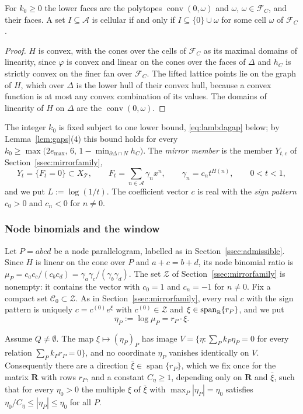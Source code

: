 \begin{lemma}\label{lem:hull}
For $k_0\ge0$ the lower faces are the polytopes $\operatorname{conv}(0,\omega)$ and $\omega$, $\omega\in\mathcal F_C$, and
their faces. A set $I\subseteq\mathcal A$ is cellular if and only if $I\subseteq\{0\}\cup\omega$ for some cell $\omega$ of
$\mathcal F_C$.
\end{lemma}

\begin{proof}
$H$ is convex, with the cones over the cells of $\mathcal F_C$ as its maximal domains of linearity, since $\varphi$ is
convex and linear on the cones over the faces of $\Delta$ and $h_C$ is strictly convex on the finer fan over
$\mathcal F_C$. The lifted lattice points lie on the graph of $H$, which over $\Delta$ is the lower hull of their convex
hull, because a convex function is at most any convex combination of its values. The domains of linearity of $H$ on
$\Delta$ are the $\operatorname{conv}(0,\omega)$.
\end{proof}

The integer $k_0$ is fixed subject to one lower bound, \eqref{eq:lambdagap} below; by Lemma~\ref{lem:gaps}(4) this
bound holds for every $k_0\ge\max\bigl(2e_{\max},\,6,\,1-\min_{\partial\Delta\cap N}h_C\bigr)$. The
\emph{mirror member} is the member $Y_{t,c}$ of Section~\ref{ssec:mirrorfamily},
\[
Y_t=\{F_t=0\}\subset X_{\mathcal T},\qquad F_t=\sum_{n\in\mathcal A}\gamma_nx^n,\qquad \gamma_n=c_nt^{H(n)},\qquad
0<t<1,
\]
and we put $L:=\log(1/t)$. The coefficient vector $c$ is real with the \emph{sign pattern} $c_0>0$ and $c_n<0$ for
$n\neq0$.

\subsubsection*{Node binomials and the window}
Let $P=abcd$ be a node parallelogram, labelled as in Section~\ref{ssec:admissible}. Since $H$ is linear on the cone over
$P$ and $a+c=b+d$, its node binomial ratio is $\mu_P=c_ac_c/(c_bc_d)=\gamma_a\gamma_c/(\gamma_b\gamma_d)$. The set
$\mathcal Z$ of Section~\ref{ssec:mirrorfamily} is nonempty: it contains the vector with $c_0=1$ and $c_n=-1$ for
$n\neq0$. Fix a compact set $\mathscr C_0\subset\mathcal Z$. As in Section~\ref{ssec:mirrorfamily}, every real $c$ with the
sign pattern is uniquely $c=c^{(0)}e^\xi$ with $c^{(0)}\in\mathcal Z$ and $\xi\in\operatorname{span}_\mathbb R\{r_P\}$, and we put
\[
\eta_P:=\log\mu_P=r_P\cdot\xi .
\]

\begin{lemma}\label{lem:eta}
Assume $Q\ne\emptyset$. The map $\xi\mapsto(\eta_P)_P$ has image $V=\{\eta:\sum_Pk_P\eta_P=0$ for every relation $\sum_Pk_Pr_P=0\}$, and no
coordinate $\eta_P$ vanishes identically on $V$. Consequently there are a direction $\bar\xi\in\operatorname{span}\{r_P\}$,
which we fix once for the matrix $\mathbf R$ with rows $r_P$, and a constant $C_\eta\ge1$, depending only on $\mathbf R$ and $\bar\xi$, such that for every $\eta_0>0$ the multiple $\xi$ of
$\bar\xi$ with $\max_P|\eta_P|=\eta_0$ satisfies $\eta_0/C_\eta\le|\eta_P|\le\eta_0$ for all $P$.
\end{lemma}

